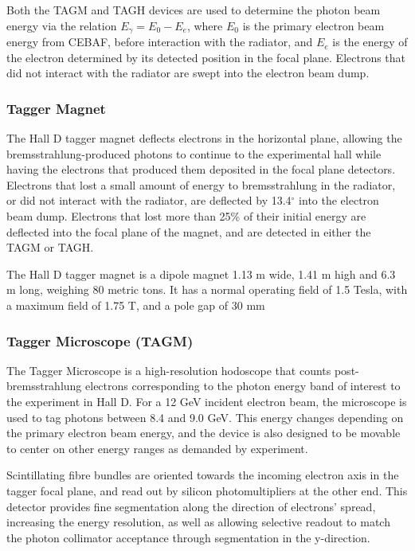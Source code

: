 Both the TAGM and TAGH devices are used to determine the photon beam energy via the relation $E_{\gamma} = E_{0} - E_{e}$, where $E_{0}$ is the primary electron beam energy from CEBAF, before interaction with the radiator, and $E_{e}$ is the energy of the electron determined by its detected position in the focal plane.
Electrons that did not interact with the radiator are swept into the electron beam dump.


\subsubsection{Tagger Magnet \label{sec:tagMagnet}}
The Hall D tagger magnet deflects electrons in the horizontal plane, allowing the bremsstrahlung-produced photons to continue to the experimental hall while having the electrons that produced them deposited in the focal plane detectors.
Electrons that lost a small amount of energy to bremsstrahlung in the
radiator, or did not interact with the radiator, are deflected by 13.4$^\circ$ into the electron beam dump.
Electrons that lost more than 25\% of their initial energy are deflected into the focal plane of the magnet, and are detected in either the TAGM or TAGH.

The Hall D tagger magnet is a dipole magnet 1.13 m wide, 1.41 m high and 6.3 m long, weighing 80 metric tons.
It has a normal operating field of 1.5 Tesla, with a maximum field of 1.75 T, and a pole gap of 30 mm


\subsubsection{Tagger Microscope (TAGM)}\label{sec:TAGM}
The Tagger Microscope is a high-resolution hodoscope that counts post-bremsstrahlung electrons corresponding to the photon energy band of interest to the experiment in Hall D.
For a 12 GeV incident electron beam, the microscope is used to tag photons between 8.4 and 9.0 GeV.
This energy changes depending on the primary electron beam energy, and the device is also designed to be movable to center on other energy ranges as demanded by experiment.

Scintillating fibre bundles are oriented towards the incoming electron axis in the tagger focal plane, and read out by silicon photomultipliers at the other end.
This detector provides fine segmentation along the direction of electrons' spread, increasing the energy resolution, as well as allowing selective readout to match the photon collimator acceptance through segmentation in the y-direction.

